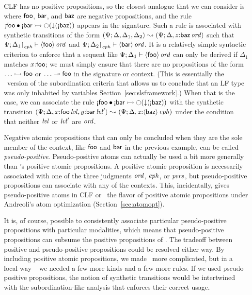 CLF has no positive propositions, so the closest analogue that we can
consider is where ${\sf foo}$, ${\sf bar}$, and ${\sf baz}$ are
negative propositions, and the rule ${\gnab}{\sf foo} \fuse
{\gnab}{\sf bar} \lefti \ocircle({\downarrow}({\gnab}{\sf baz}))$ appears in the
signature. Such a rule is associated with synthetic transitions of the
form
%
$(\Psi; {\Delta},{{\Delta_1},{\Delta_2}}) \leadsto
(\Psi; {\Delta},{z{:}{{\sf baz}}\,{{\it ord}}})$ such that
${\Psi};{{\Delta_1}{\upharpoonright}_{{\it eph}}} \vdash {{\langle {\sf foo} \rangle}\,{{\it ord}}} \mathstrut$
and ${\Psi};{{\Delta_2}{\upharpoonright}_{{\it eph}}} \vdash {{\langle {\sf
      bar} \rangle}\,{{\it ord}}} \mathstrut$. It is a relatively simple syntactic criterion to
enforce that a sequent like ${\Psi};{\Delta_1} \vdash {{\langle {\sf
      foo} \rangle}\,{{\it ord}}} \mathstrut$ can only be derived if $\Delta_1$ matches
$x{:}\sf{foo}$; we must simply ensure that there are no propositions
of the form $\ldots \rightarrowtail {\sf foo}$ or $\ldots \twoheadrightarrow {\sf foo}$ in
the signature or context. (This is essentially the \sls~version of the
subordination criteria that allows us to conclude that an LF type was
only inhabited by variables Section~\ref{sec:slsframework}.)
%
When that is the case, we can
associate the rule ${\gnab}{\sf foo} \fuse
{\gnab}{\sf bar} \lefti \ocircle({\downarrow}({\gnab}{\sf baz}))$
with the synthetic transition $(\Psi;
{\Delta},{{x{:}{{\sf foo}\,{{\it lvl}}}},{y{:}{{\sf
        bar}\,{{\it lvl}}'}}}) \leadsto (\Psi; {\Delta},{z{:}{\langle {\sf
      baz} \rangle}\,{{\it eph}}})$ under the condition that neither ${\it lvl}$ or ${\it lvl}'$
are ${\it ord}$.

Negative atomic propositions that can only be concluded when they are
the sole member of the context, like ${\sf foo}$ and ${\sf bar}$ in
the previous example, can be called {\it
  pseudo-positive}. Pseudo-positive atoms can actually be used a bit
more generally than \sls's positive atomic propositions. A positive
atomic proposition is necessarily associated with one of the three
judgments ${\it ord}$, ${\it eph}$, or ${\it pers}$, but pseudo-positive
propositions can associate with any of the contexts. This,
incidentally, gives pseudo-positive atoms in CLF or \sls~the flavor of
positive atomic propositions under Andreoli's atom optimization
(Section~\ref{sec:atomopt}).

It is, of course, possible to consistently associate particular
pseudo-positive propositions with particular modalities, which means
that pseudo-positive propositions can subsume the positive
propositions of \sls. The tradeoff between positive and
pseudo-positive propositions could be resolved either way. By
including positive atomic propositions, we made \sls~more complicated,
but in a local way -- we needed a few more kinds and a few more
rules. If we used pseudo-positive propositions, the notion of
synthetic transitions would be intertwined with the subordination-like
analysis that enforces their correct usage.

